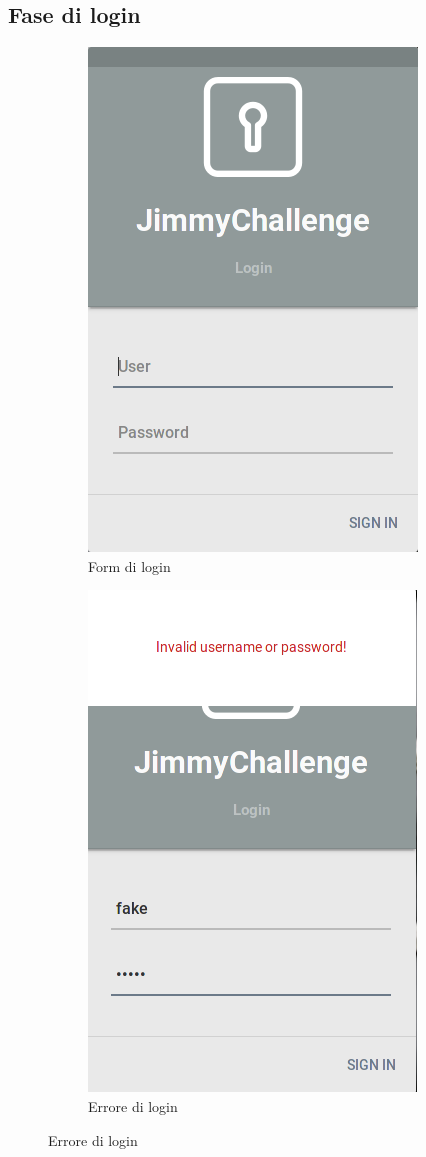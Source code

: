 \subsection{Fase di login}
\begin{figure}[!ht]
	\centering
	\begin{subfigure}[b]{0.5\textwidth}
		\includegraphics[scale=.4]{img/testing/login.png}
		\caption{Form di login}
	\end{subfigure}
	\begin{subfigure}[b]{0.4\textwidth}
		\includegraphics[scale=.4]{img/testing/login_error.png}
		\caption{Errore di login}
	\end{subfigure}
\end{figure}

